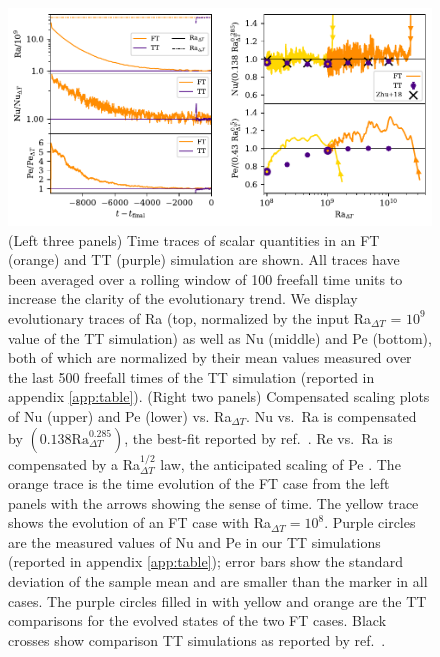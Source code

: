 \documentclass[aps, pre, onecolumn, nofootinbib, notitlepage, groupedaddress, amsfonts, amssymb, amsmath, longbibliography, superscriptaddress]{revtex4-1}
\begin{document}
\begin{figure}[t!]
\includegraphics[width=\textwidth]{./figs/rbc_scalar_comparisons.pdf}
\caption{ 
	(Left three panels) Time traces of scalar quantities in an FT (orange) and TT (purple) simulation are shown.
	All traces have been averaged over a rolling window of 100 freefall time units to increase the clarity of the evolutionary trend.
	We display evolutionary traces of Ra (top, normalized by the input Ra$_{\Delta T}$ = $10^9$ value of the TT simulation) as well as Nu (middle) and Pe (bottom), both of which are normalized by their mean values measured over the last 500 freefall times of the TT simulation (reported in appendix \ref{app:table}).
	(Right two panels) Compensated scaling plots of Nu (upper) and Pe (lower) vs. Ra$_{\Delta T}$.
	Nu vs.~Ra is compensated by $(0.138 \text{Ra}_{\Delta T}^{0.285})$, the best-fit reported by ref.~\cite{johnston&doering2009}.
	Re vs.~Ra is compensated by a Ra$_{\Delta T}^{1/2}$ law, the anticipated scaling of Pe \cite{ahlers&all2009}.
	The orange trace is the time evolution of the FT case from the left panels with the arrows showing the sense of time.
	The yellow trace shows the evolution of an FT case with Ra$_{\Delta T} = 10^8$.
	Purple circles are the measured values of Nu and Pe in our TT simulations (reported in appendix \ref{app:table}); error bars show the standard deviation of the sample mean and are smaller than the marker in all cases.
	The purple circles filled in with yellow and orange are the TT comparisons for the evolved states of the two FT cases.
	Black crosses show comparison TT simulations as reported by ref.~\cite{zhu&all2018}.
\label{fig:rbc_scalar_comparisons} }
\end{figure}



\vspace{-0.25cm}
\end{document}
